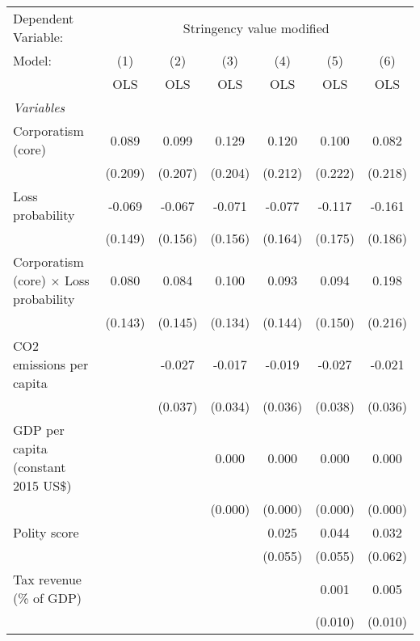 
\begingroup
\centering
\begin{tabular}{lcccccc}
   \toprule
   Dependent Variable: & \multicolumn{6}{c}{Stringency value modified}\\
   Model:                                        & (1)     & (2)     & (3)     & (4)     & (5)     & (6)\\  
                                                 &  OLS    & OLS     & OLS     & OLS     & OLS     & OLS\\  
   \midrule
   \emph{Variables}\\
   Corporatism (core)                            & 0.089   & 0.099   & 0.129   & 0.120   & 0.100   & 0.082\\   
                                                 & (0.209) & (0.207) & (0.204) & (0.212) & (0.222) & (0.218)\\   
   Loss probability                              & -0.069  & -0.067  & -0.071  & -0.077  & -0.117  & -0.161\\   
                                                 & (0.149) & (0.156) & (0.156) & (0.164) & (0.175) & (0.186)\\   
   Corporatism (core) $\times$ Loss probability  & 0.080   & 0.084   & 0.100   & 0.093   & 0.094   & 0.198\\   
                                                 & (0.143) & (0.145) & (0.134) & (0.144) & (0.150) & (0.216)\\   
   CO2 emissions per capita                      &         & -0.027  & -0.017  & -0.019  & -0.027  & -0.021\\   
                                                 &         & (0.037) & (0.034) & (0.036) & (0.038) & (0.036)\\   
   GDP per capita (constant 2015 US\$)           &         &         & 0.000   & 0.000   & 0.000   & 0.000\\   
                                                 &         &         & (0.000) & (0.000) & (0.000) & (0.000)\\   
   Polity score                                  &         &         &         & 0.025   & 0.044   & 0.032\\   
                                                 &         &         &         & (0.055) & (0.055) & (0.062)\\   
   Tax revenue (\% of GDP)                       &         &         &         &         & 0.001   & 0.005\\   
                                                 &         &         &         &         & (0.010) & (0.010)\\   

\end{tabular}
